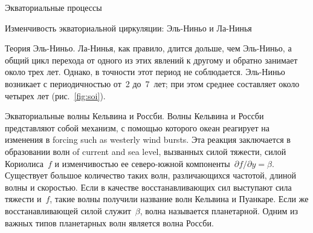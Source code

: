 \begin{chapter}{Экваториальные процессы}
\begin{section}{Изменчивость экваториальной циркуляции: Эль-Ниньо и Ла-Нинья}
\begin{paragraph}{Теория Эль-Ниньо.}
Ла-Нинья, как правило, длится дольше, чем Эль-Ниньо, а общий цикл перехода от
одного из этих явлений к другому и обратно занимает около трех лет. Однако,
в точности этот период не соблюдается. Эль-Ниньо возникает с периодичностью
от~2 до~7~лет; при этом среднее составляет около четырех лет 
(рис.~\ref{fig:soi}).
%
\end{paragraph}

\begin{paragraph}{Экваториальные волны Кельвина и Россби.}
Волны Кельвина и Россби представляют собой механизм,
с помощью которого океан реагирует на изменения в forcing such as westerly 
wind bursts. Эта реакция заключается в образовании волн of current and 
sea level, вызванных силой тяжести, силой Кориолиса~$f$ и изменчивостью ее
северо-южной компоненты~$\partial f/\partial y = \beta$. Существует большое
количество таких волн, различающихся частотой, длиной волны и скоростью.
Если в качестве восстанавливающих сил выступают сила тяжести и~$f$, такие
волны получили название волн Кельвина и Пуанкаре. Если же восстанавливающей
силой служит~$\beta$, волна называется планетарной. Одним из важных типов
планетарных волн является волна Россби.
%


\end{paragraph}
\end{section}
\end{chapter}
